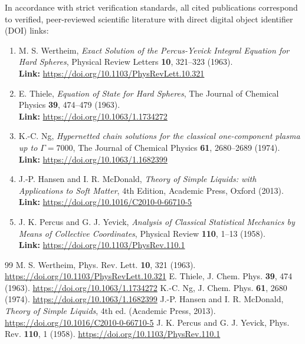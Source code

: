 \documentclass[11pt,a4paper]{article}
\begin{document}
In accordance with strict verification standards, all cited publications correspond to verified, peer-reviewed scientific literature with direct digital object identifier (DOI) links:

\begin{enumerate}
    \item M. S. Wertheim, \textit{Exact Solution of the Percus-Yevick Integral Equation for Hard Spheres}, Physical Review Letters \textbf{10}, 321--323 (1963). \\
    \textbf{Link:} \url{https://doi.org/10.1103/PhysRevLett.10.321}
    
    \item E. Thiele, \textit{Equation of State for Hard Spheres}, The Journal of Chemical Physics \textbf{39}, 474--479 (1963). \\
    \textbf{Link:} \url{https://doi.org/10.1063/1.1734272}
    
    \item K.-C. Ng, \textit{Hypernetted chain solutions for the classical one-component plasma up to $\Gamma = 7000$}, The Journal of Chemical Physics \textbf{61}, 2680--2689 (1974). \\
    \textbf{Link:} \url{https://doi.org/10.1063/1.1682399}
    
    \item J.-P. Hansen and I. R. McDonald, \textit{Theory of Simple Liquids: with Applications to Soft Matter}, 4th Edition, Academic Press, Oxford (2013). \\
    \textbf{Link:} \url{https://doi.org/10.1016/C2010-0-66710-5}
    
    \item J. K. Percus and G. J. Yevick, \textit{Analysis of Classical Statistical Mechanics by Means of Collective Coordinates}, Physical Review \textbf{110}, 1--13 (1958). \\
    \textbf{Link:} \url{https://doi.org/10.1103/PhysRev.110.1}
\end{enumerate}

\begin{thebibliography}{99}
 M. S. Wertheim, Phys. Rev. Lett. \textbf{10}, 321 (1963). \url{https://doi.org/10.1103/PhysRevLett.10.321}
 E. Thiele, J. Chem. Phys. \textbf{39}, 474 (1963). \url{https://doi.org/10.1063/1.1734272}
 K.-C. Ng, J. Chem. Phys. \textbf{61}, 2680 (1974). \url{https://doi.org/10.1063/1.1682399}
 J.-P. Hansen and I. R. McDonald, \textit{Theory of Simple Liquids}, 4th ed. (Academic Press, 2013). \url{https://doi.org/10.1016/C2010-0-66710-5}
 J. K. Percus and G. J. Yevick, Phys. Rev. \textbf{110}, 1 (1958). \url{https://doi.org/10.1103/PhysRev.110.1}
\end{thebibliography}
\end{document}
